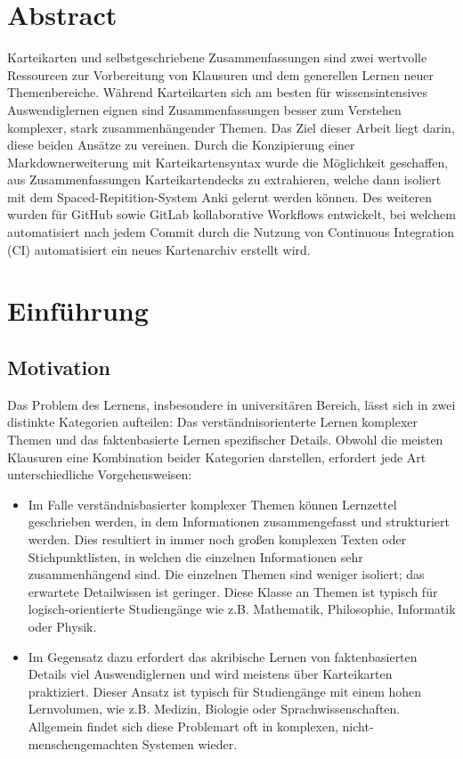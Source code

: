 \documentclass[ngerman]{article}
\begin{document}
\maketitle
\section*{Abstract}
Karteikarten und selbstgeschriebene Zusammenfassungen sind zwei wertvolle Ressourcen zur Vorbereitung von Klausuren und dem generellen Lernen neuer Themenbereiche. Während Karteikarten sich am besten für wissensintensives Auswendiglernen eignen sind Zusammenfassungen besser zum Verstehen komplexer, stark zusammenhängender Themen. Das Ziel dieser Arbeit liegt darin, diese beiden Ansätze zu vereinen. Durch die Konzipierung einer Markdownerweiterung mit Karteikartensyntax wurde die Möglichkeit geschaffen, aus Zusammenfassungen Karteikartendecks zu extrahieren, welche dann isoliert mit dem Spaced-Repitition-System Anki gelernt werden können. Des weiteren wurden für GitHub sowie GitLab kollaborative Workflows entwickelt, bei welchem automatisiert nach jedem Commit durch die Nutzung von Continuous Integration (CI) automatisiert ein neues Kartenarchiv erstellt wird.
\tableofcontents
\newpage


\section{Einführung}
\subsection{Motivation}
Das Problem des Lernens, insbesondere in universitären Bereich, lässt sich in zwei distinkte Kategorien aufteilen: Das verständnisorienterte Lernen komplexer Themen und das faktenbasierte Lernen spezifischer Details. Obwohl die meisten Klausuren eine Kombination beider Kategorien darstellen, erfordert jede Art unterschiedliche Vorgehensweisen:

\begin{itemize}
\item Im Falle verständnisbasierter komplexer Themen können Lernzettel geschrieben werden, in dem Informationen zusammengefasst und strukturiert werden. Dies resultiert in immer noch großen komplexen Texten oder Stichpunktlisten, in welchen die einzelnen Informationen sehr zusammenhängend sind. Die einzelnen Themen sind weniger isoliert; das erwartete Detailwissen ist geringer. Diese Klasse an Themen ist typisch für logisch-orientierte Studiengänge wie z.B. Mathematik, Philosophie, Informatik oder Physik.
\item Im Gegensatz dazu erfordert das akribische Lernen von faktenbasierten Details viel Auswendiglernen und wird meistens über Karteikarten praktiziert. Dieser Ansatz ist typisch für Studiengänge mit einem hohen Lernvolumen, wie z.B. Medizin, Biologie oder Sprachwissenschaften. Allgemein findet sich diese Problemart oft in komplexen, nicht-menschengemachten Systemen wieder.
\end{itemize}
\end{document}

